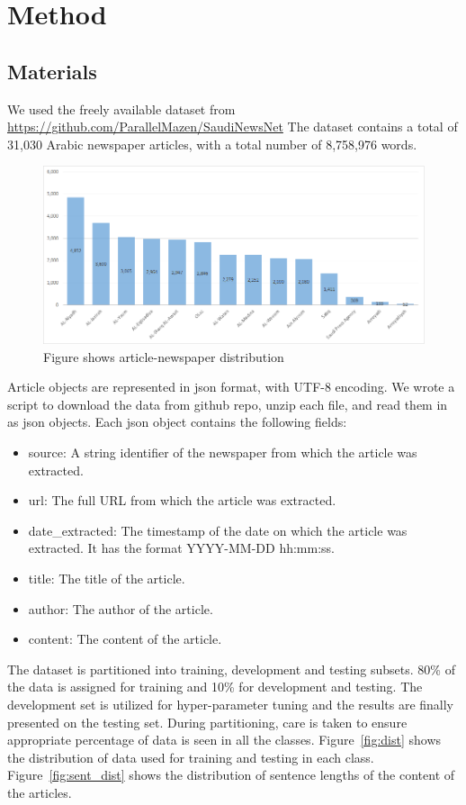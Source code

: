 \documentclass[12pt]{article}
\begin{document}
\section{Method}\label{method}
\subsection{Materials}
We used the freely available dataset from
\url{https://github.com/ParallelMazen/SaudiNewsNet} The dataset contains
a total of 31,030 Arabic newspaper articles, with a total number of 8,758,976 words. 

\begin{figure}[h!]
\centering
\includegraphics[width=\textwidth]{figures/article-newspaper_distribution.png}
\caption{Figure shows article-newspaper distribution}
\end{figure}

Article objects are represented in json format, with UTF-8 encoding. We wrote a script to download the data from github repo, unzip each file, and read them in as json objects. Each json object contains the following fields:

\begin{itemize}
\item source: A string identifier of the newspaper from which the article was extracted.
\item url: The full URL from which the article was extracted.
\item date\_extracted: The timestamp of the date on which the article was extracted. It has the format YYYY-MM-DD hh:mm:ss. 
\item title: The title of the article. 
\item author: The author of the article.
\item content: The content of the article.
\end{itemize}

The dataset is partitioned into training, development and testing subsets. 80\% of the data is assigned for training and 10\% for development and testing. The development set is utilized for hyper-parameter tuning and the results are finally presented on the testing set. During partitioning, care is taken to ensure appropriate percentage of data is seen in all the classes. Figure~\ref{fig:dist} shows the distribution of data used for training and testing in each class. Figure~\ref{fig:sent_dist} shows the distribution of sentence lengths of the content of the articles.
\end{document}
